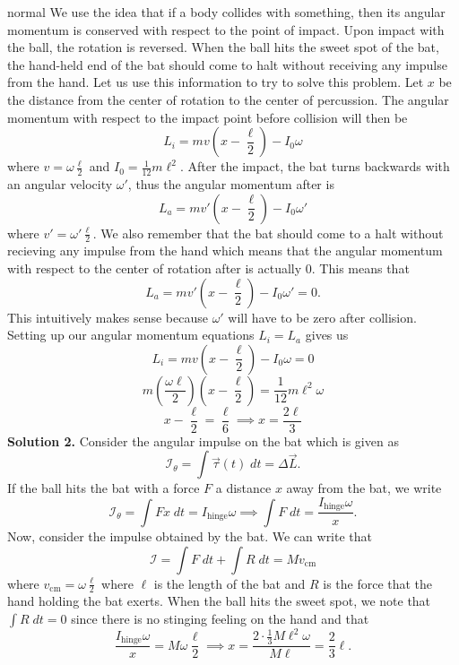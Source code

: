 \begin{solution}{normal}
We use the idea that if a body collides with something, then its angular momentum is conserved with respect to the point of impact. Upon impact with the ball, the rotation is reversed. When the ball hits the sweet spot of the bat, the hand-held end
of the bat should come to halt without receiving any impulse from the hand. Let us use this information to try to solve this problem. Let $x$ be the distance from the center of rotation to the center of percussion. The angular momentum with respect to the impact point before collision will then be
$$L_i=mv\left(x-\frac{\ell}{2}\right)-I_0\omega$$where $v=\omega\frac{\ell}{2}$ and $I_0=\frac{1}{12}m\ell^2$. After the impact, the bat turns backwards with an angular velocity $\omega'$, thus the angular momentum after is
$$L_a=mv'\left(x-\frac{\ell}{2}\right)-I_0\omega'$$where $v'=\omega'\frac{\ell}{2}$. We also remember that the bat should come to a halt without recieving any impulse from the hand which means that the angular momentum with respect to the center of rotation after is actually $0$. This means that
$$L_a=mv'\left(x-\frac{\ell}{2}\right)-I_0\omega'=0.$$This intuitively makes sense because $\omega'$ will have to be zero after collision. Setting up our angular momentum equations $L_i=L_a$ gives us
$$L_i=mv\left(x-\frac{\ell}{2}\right)-I_0\omega=0$$$$m\left(\frac{\omega\ell}{2}\right)\left(x-\frac{\ell}{2}\right)=\frac{1}{12}m\ell^2\omega$$$$x-\frac{\ell}{2}=\frac{\ell}{6}\implies\boxed{x=\frac{2\ell}{3}}$$
\tcbline 
\textbf{Solution 2.} Consider the angular impulse on the bat which is given as 
\[\mathcal{I}_{\theta} = \int \vec{\tau} (t)\; dt = \Delta \vec{L}.\]
If the ball hits the bat with a force $F$ a distance $x$ away from the bat, we write 
\[\mathcal{I}_{\theta} = \int F x\; dt = I_{\text{hinge}} \omega\implies \int F\; dt = \frac{I_{\text{hinge}} \omega}{x}.\]
Now, consider the impulse obtained by the bat. We can write that 
\[\mathcal{I} = \int F\; dt + \int R\; dt = Mv_{\text{cm}}\]
where $v_{\text{cm}} = \omega \frac{\ell}{2}$ where $\ell$ is the length of the bat and $R$ is the force that the hand holding the bat exerts. When the ball hits the sweet spot, we note that $\int R\; dt = 0$ since there is no stinging feeling on the hand and that 
\[\frac{I_{\text{hinge}} \omega}{x} = M\omega \frac{\ell}{2}\implies x = \frac{2\cdot \frac{1}{3}M\ell^2 \omega}{M \ell} = \frac{2}{3}\ell.\]
\end{solution}
